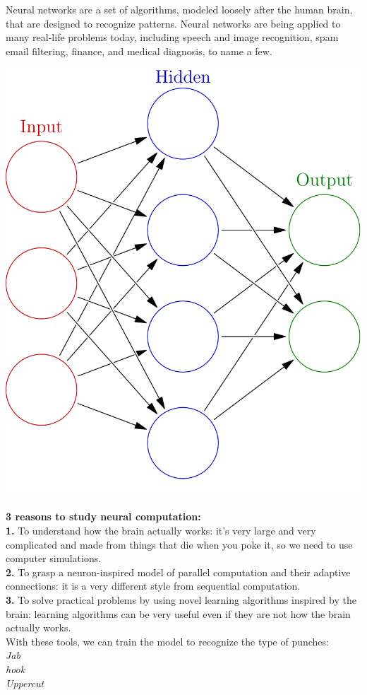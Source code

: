 \documentclass[a4paper,12pt,twoside]{report}
\begin{document}
Neural networks are a set of algorithms, modeled loosely after the human brain, that are designed to recognize patterns. Neural networks are being applied to many real-life problems today, including speech and image recognition, spam email filtering, finance, and medical diagnosis, to name a few.
\begin{center}
\includegraphics[scale=.19]{images/NeuralNetwork.png}
\end{center}
\textbf{3 reasons to study neural computation:}\\
\textbf{1.} To understand how the brain actually works: it's very large and very complicated and made from things that die when you poke it, so we need to use computer simulations.\\
\textbf{2.} To grasp a neuron-inspired model of parallel computation and their adaptive connections: it is a very different style from sequential computation.\\
\textbf{3.} To solve practical problems by using novel learning algorithms inspired by the brain: learning algorithms can be very useful even if they are not how the brain actually works.
\\
With these tools, we can train the model to recognize the type of punches:\\
\textit{Jab\\hook\\Uppercut}
\end{document}
